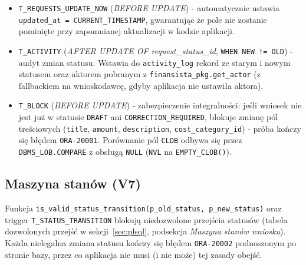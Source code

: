 \documentclass[12pt,a4paper]{article}
\begin{document}
\begin{itemize}[leftmargin=*]
  \item \texttt{T\_REQUESTS\_UPDATE\_NOW} (\emph{BEFORE UPDATE}) - automatycznie
        ustawia \texttt{updated\_at = CURRENT\_TIMESTAMP}, gwarantując że pole
        nie zostanie pominięte przy zapomnianej aktualizacji w kodzie aplikacji.
  \item \texttt{T\_ACTIVITY} (\emph{AFTER UPDATE OF request\_status\_id},
        \texttt{WHEN NEW != OLD}) - audyt zmian statusu. Wstawia do
        \texttt{activity\_log} rekord ze starym i nowym statusem oraz aktorem
        pobranym z \texttt{finansista\_pkg.get\_actor} (z fallbackiem na
        wnioskodawcę, gdyby aplikacja nie ustawiła aktora).
  \item \texttt{T\_BLOCK} (\emph{BEFORE UPDATE}) - zabezpieczenie integralności:
        jeśli wniosek nie jest już w statusie \texttt{DRAFT} ani
        \texttt{CORRECTION\_REQUIRED}, blokuje zmianę pól treściowych
        (\texttt{title}, \texttt{amount}, \texttt{description},
        \texttt{cost\_category\_id}) - próba kończy się błędem
        \texttt{ORA-20001}. Porównanie pól \texttt{CLOB} odbywa się przez
        \texttt{DBMS\_LOB.COMPARE} z obsługą \texttt{NULL} (\texttt{NVL}
        na \texttt{EMPTY\_CLOB()}).
\end{itemize}

\subsection{Maszyna stanów (V7)}
Funkcja \texttt{is\_valid\_status\_transition(p\_old\_status, p\_new\_status)} oraz trigger
\texttt{T\_STATUS\_TRANSITION} blokują niedozwolone przejścia statusów
(tabela dozwolonych przejść w sekcji~\ref{sec:plsql}, podsekcja \emph{Maszyna stanów wniosku}).
Każda nielegalna zmiana statusu kończy się błędem \texttt{ORA-20002} podnoszonym
po stronie bazy, przez co aplikacja nie musi (i nie może) tej zasady obejść.
\end{document}

